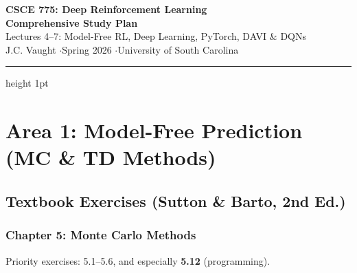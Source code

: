 \documentclass[11pt,letterpaper]{article}
\begin{document}
\begin{center}
{\LARGE\bfseries\color{garnet} CSCE 775: Deep Reinforcement Learning\\[4pt] Comprehensive Study Plan}\\[8pt]
{\large Lectures 4--7: Model-Free RL, Deep Learning, PyTorch, DAVI \& DQNs}\\[4pt]
{\normalsize J.C. Vaught \quad$\cdot$\quad Spring 2026 \quad$\cdot$\quad University of South Carolina}
\end{center}

\vspace{6pt}
\hrule height 1pt
\vspace{12pt}

\tableofcontents
\newpage

\section{Area 1: Model-Free Prediction (MC \& TD Methods)}

\subsection{Textbook Exercises (Sutton \& Barto, 2nd Ed.)}

\subsubsection{Chapter 5: Monte Carlo Methods}

Priority exercises: 5.1--5.6, and especially \textbf{5.12} (programming).
\end{document}
